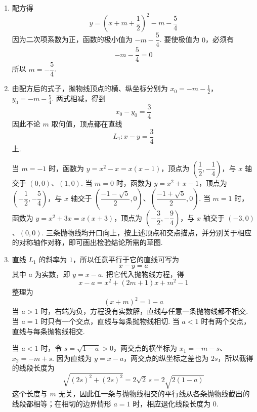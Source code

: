 \begin{solution}
\begin{enumerate}
\item 配方得
\[
y=\left(x+m+\frac{1}{2}\right)^{2}-m-\frac{5}{4}
\]
因为二次项系数为正，函数的极小值为 \(-m-\dfrac{5}{4}\). 要使极值为 \(0\)，必须有
\[
-m-\frac{5}{4}=0
\]
所以 \(m=-\dfrac{5}{4}\).

\item 由配方后的式子，抛物线顶点的横、纵坐标分别为
\(x_{0}=-m-\frac{1}{2}\)，\(y_{0}=-m-\frac{5}{4}\).
两式相减，得到
\[
x_{0}-y_{0}=\frac{3}{4}
\]
因此不论 \(m\) 取何值，顶点都在直线
\[
L_{1}:x-y=\frac{3}{4}
\]
上.

当 \(m=-1\) 时，函数为 \(y=x^{2}-x=x(x-1)\)，顶点为 \(\left(\dfrac{1}{2},-\dfrac{1}{4}\right)\)，与 \(x\) 轴交于 \((0,0)\)、\((1,0)\). 当 \(m=0\) 时，函数为 \(y=x^{2}+x-1\)，顶点为 \(\left(-\dfrac{1}{2},-\dfrac{5}{4}\right)\)，与 \(x\) 轴交于 \(\left(\dfrac{-1-\sqrt{5}}{2},0\right)\)、\(\left(\dfrac{-1+\sqrt{5}}{2},0\right)\). 当 \(m=1\) 时，函数为 \(y=x^{2}+3x=x(x+3)\)，顶点为 \(\left(-\dfrac{3}{2},-\dfrac{9}{4}\right)\)，与 \(x\) 轴交于 \((-3,0)\)、\((0,0)\). 三条抛物线均开口向上，按上述顶点和交点描点，并分别关于相应的对称轴作对称，即可画出检验结论所需的草图.

\item 直线 \(L_{1}\) 的斜率为 \(1\)，所以任意平行于它的直线可写为
\[
x-y=a
\]
其中 \(a\) 为实数，即 \(y=x-a\). 把它代入抛物线方程，得
\[
x-a=x^{2}+(2m+1)x+m^{2}-1
\]
整理为
\[
(x+m)^{2}=1-a
\]
当 \(a>1\) 时，右端为负，方程没有实数解，直线与任意一条抛物线都不相交. 当 \(a=1\) 时只有一个交点，直线与每条抛物线相切. 当 \(a<1\) 时有两个交点，直线与每条抛物线相交.

当 \(a<1\) 时，令 \(s=\sqrt{1-a}>0\)，两交点的横坐标为 \(x_{1}=-m-s\)、\(x_{2}=-m+s\). 因为直线为 \(y=x-a\)，两交点的纵坐标之差也为 \(2s\)，所以截得的线段长度为
\[
\sqrt{(2s)^{2}+(2s)^{2}}=2\sqrt{2}\,s=2\sqrt{2(1-a)}
\]
这个长度与 \(m\) 无关，因此任一条与抛物线相交的平行线从各条抛物线截出的线段都相等；在相切的边界情形 \(a=1\) 时，相应退化线段长度为 \(0\).
\end{enumerate}
\end{solution}

